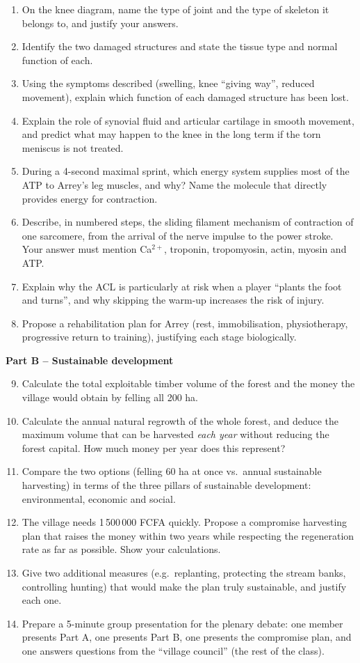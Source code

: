 \documentclass[11pt]{article}
\newcommand{\cle}[1]{{\popxbold\color{popdark}#1}}
\begin{document}
\begin{enumerate}
\item On the knee diagram, name the type of joint and the type of skeleton it belongs to, and justify your answers.
\item Identify the two damaged structures and state the tissue type and normal function of each.
\item Using the symptoms described (swelling, knee ``giving way'', reduced movement), explain which function of each damaged structure has been lost.
\item Explain the role of \cle{synovial fluid} and \cle{articular cartilage} in smooth movement, and predict what may happen to the knee in the long term if the torn meniscus is not treated.
\item During a 4-second maximal sprint, which energy system supplies most of the ATP to Arrey's leg muscles, and why? Name the molecule that directly provides energy for contraction.
\item Describe, in numbered steps, the sliding filament mechanism of contraction of one sarcomere, from the arrival of the nerve impulse to the power stroke. Your answer must mention Ca$^{2+}$, troponin, tropomyosin, actin, myosin and ATP.
\item Explain why the ACL is particularly at risk when a player ``plants the foot and turns'', and why skipping the warm-up increases the risk of injury.
\item Propose a rehabilitation plan for Arrey (rest, immobilisation, physiotherapy, progressive return to training), justifying each stage biologically.
\end{enumerate}

\textbf{Part B -- Sustainable development}

\begin{enumerate}
\setcounter{enumi}{8}
\item Calculate the total exploitable timber volume of the forest and the money the village would obtain by felling all 200 ha.
\item Calculate the annual natural regrowth of the whole forest, and deduce the maximum volume that can be harvested \emph{each year} without reducing the forest capital. How much money per year does this represent?
\item Compare the two options (felling 60 ha at once vs.\ annual sustainable harvesting) in terms of the three pillars of sustainable development: environmental, economic and social.
\item The village needs 1\,500\,000 FCFA quickly. Propose a compromise harvesting plan that raises the money within two years while respecting the regeneration rate as far as possible. Show your calculations.
\item Give two additional measures (e.g.\ replanting, protecting the stream banks, controlling hunting) that would make the plan truly sustainable, and justify each one.
\item Prepare a 5-minute group presentation for the plenary debate: one member presents Part A, one presents Part B, one presents the compromise plan, and one answers questions from the ``village council'' (the rest of the class).
\end{enumerate}
\end{document}
